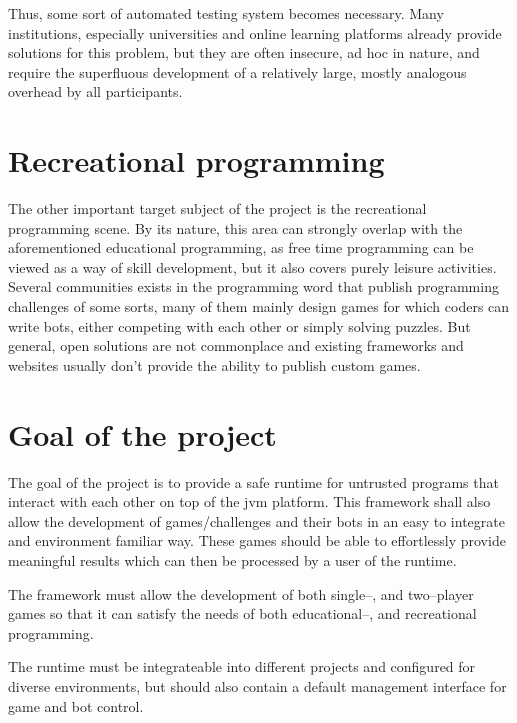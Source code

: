 	Thus, some sort of automated testing system becomes necessary. Many institutions, especially universities and online learning platforms already provide solutions for this problem, but they are often insecure, ad hoc in nature, and require the superfluous development of a relatively large, mostly analogous overhead by all participants.
	
	\section{Recreational programming}

	The other important target subject of the project is the recreational programming scene. By its nature, this area can strongly overlap with the aforementioned educational programming, as free time programming can be viewed as a way of skill development, but it also covers purely leisure activities. Several communities exists in the programming word that publish programming challenges of some sorts, many of them mainly design games for which coders can write bots, either competing with each other or simply solving puzzles. But general, open solutions are not commonplace and existing frameworks and websites usually don't provide the ability to publish custom games. 

	\section{Goal of the project}
	
	The goal of the project is to provide a safe runtime for untrusted programs that interact with each other on top of the jvm platform. This framework shall also allow the development of games/challenges and their bots in an easy to integrate and environment familiar way. These games should be able to effortlessly provide meaningful results which can then be processed by a user of the runtime.
	
	The framework must allow the development of both single--, and two--player games so that it can satisfy the needs of both educational--, and recreational programming.
	
	The runtime must be integrateable into different projects and configured for diverse environments, but should also contain a default management interface for game and bot control. 

%













